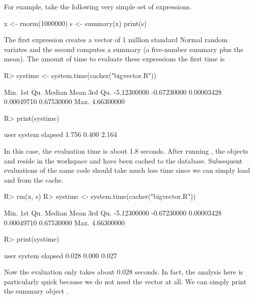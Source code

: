 \documentclass[nojss]{jss}
\begin{document}
For example, take the following very simple set of expressions.
\begin{Schunk}
\begin{Soutput}
x <- rnorm(1000000)
s <- summary(x)
print(s)
\end{Soutput}
\end{Schunk}
The first expression creates a vector of 1 million standard Normal
random variates and the second computes a summary (a five-number
summary plus the mean).  The amount of time to evaluate these
expressions the first time is
\begin{Schunk}
\begin{Sinput}
R> systime <- system.time(cacher("bigvector.R"))
\end{Sinput}
\begin{Soutput}
       Min.     1st Qu.      Median        Mean     3rd Qu. 
-5.12300000 -0.67230000  0.00003428  0.00049710  0.67530000 
       Max. 
 4.66300000 
\end{Soutput}
\begin{Sinput}
R> print(systime)
\end{Sinput}
\begin{Soutput}
   user  system elapsed 
  1.756   0.400   2.164 
\end{Soutput}
\end{Schunk}
In this case, the evaluation time is about
1.8 seconds.  After running
, the objects  and  reside in the
workspace and have been cached to the database.  Subsequent
evaluations of the same code should take much less time since we can
simply load  and  from the cache.
\begin{Schunk}
\begin{Sinput}
R> rm(x, s)
R> systime <- system.time(cacher("bigvector.R"))
\end{Sinput}
\begin{Soutput}
       Min.     1st Qu.      Median        Mean     3rd Qu. 
-5.12300000 -0.67230000  0.00003428  0.00049710  0.67530000 
       Max. 
 4.66300000 
\end{Soutput}
\begin{Sinput}
R> print(systime)
\end{Sinput}
\begin{Soutput}
   user  system elapsed 
  0.028   0.000   0.027 
\end{Soutput}
\end{Schunk}
Now the evaluation only takes about
0.028 seconds.  In fact, the
analysis here is particularly quick because we do not need the
 vector at all.  We can simply print the summary object
.
\end{document}
